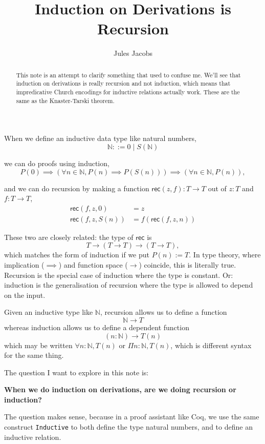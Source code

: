 \documentclass[a4paper, 11pt]{article}
\title{Induction on Derivations is Recursion}
\author{Jules Jacobs}
\newcommand{\N}{\mathbb{N}}
\newcommand{\rec}{\mathsf{rec}}
\theoremstyle{definition}
\begin{document}
\maketitle

\begin{abstract}
  This note is an attempt to clarify something that used to confuse me. We'll see that induction on derivations is really recursion and not induction, which means that impredicative Church encodings for inductive relations actually work. These are the same as the Knaster-Tarski theorem.
\end{abstract}

When we define an inductive data type like natural numbers,
\[
  \N ::= 0 \mid S(\N)
\]

we can do proofs using induction,
\[
  P(0) \implies (\forall n\in \N, P(n) \implies P(S(n))) \implies (\forall n\in \N, P(n)),
\]

and we can do recursion by making a function $\rec(z,f) : T \to T$ out of $z : T$ and $f : T \to T$,
\begin{align*}
  \rec(f,z,0) &= z \\
  \rec(f,z,S(n)) &= f(\rec(f,z,n))
\end{align*}

These two are closely related: the type of $\rec$ is
\[
  T \to (T \to T) \to (T \to T),
\]
which matches the form of induction if we put $P(n) := T$. In type theory, where implication ($\implies$) and function space ($\to$) coincide, this is literally true. Recursion is the special case of induction where the type is constant. Or: induction is the generalisation of recursion where the type is allowed to depend on the input.

Given an inductive type like $\N$, recursion allows us to define a function
\[
  \N \to T
\]
whereas induction allows us to define a dependent function
\[
  (n : \N) \to T(n)
\]
which may be written $\forall n : \N, T(n)$ or $\Pi n : \N, T(n)$, which is different syntax for the same thing.

The question I want to explore in this note is:

\begin{center}
  \textbf{When we do induction on derivations, are we doing recursion or induction?}
\end{center}

The question makes sense, because in a proof assistant like Coq, we use the same construct \lstinline|Inductive| to both define the type natural numbers, and to define an inductive relation.
\end{document}
